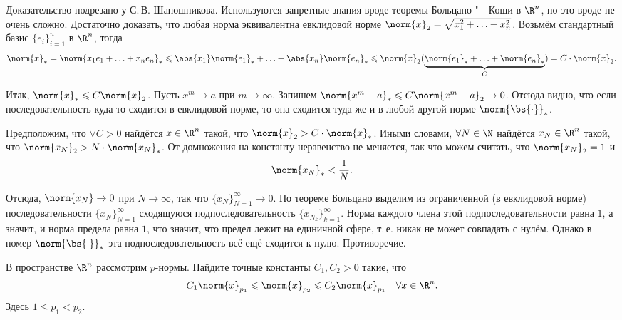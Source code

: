 \begin{solution}
    Доказательство подрезано у С.\,В. Шапошникова. Используются запретные знания вроде теоремы Больцано "---Коши в $\R^n$, но это вроде не очень сложно. Достаточно доказать, что любая норма эквивалентна евклидовой норме $\norm{x}_2 = \sqrt{x_1^2 + \ldots + x_n^2}$. Возьмём стандартный базис $\{e_i\}_{i = 1}^n$ в $\R^n$, тогда
    \[
        \norm{x}_\ast = \norm{x_1e_1 + \ldots + x_ne_n}_\ast \leqslant \abs{x_1}\norm{e_1}_\ast + \ldots + \abs{x_n}\norm{e_n}_\ast \leqslant \norm{x}_2(\underbrace{\norm{e_1}_\ast + \ldots + \norm{e_n}_\ast}_C) = C \cdot \norm{x}_2.
    \]

    Итак, $\norm{x}_\ast \leqslant C\norm{x}_2$. Пусть $x^m \to a$ при $m \to \infty$. Запишем $\norm{x^m - a}_\ast \leqslant C\norm{x^m - a}_2 \to 0$. Отсюда видно, что если последовательность куда-то сходится в евклидовой норме, то она сходится туда же и в любой другой норме $\norm{\bs{\cdot}}_\ast$.

    Предположим, что $\forall C > 0$ найдётся $x \in \R^n$ такой, что $\norm{x}_2 > C \cdot \norm{x}_\ast$. Иными словами, $\forall N \in \N$ найдётся $x_N \in \R^n$ такой, что $\norm{x_N}_2 > N \cdot \norm{x_N}_\ast$. От домножения на константу неравенство не меняется, так что можем считать, что $\norm{x_N}_2 = 1$ и
    \[
        \norm{x_N}_\ast < \frac{1}{N}.
    \]

    Отсюда, $\norm{x_N} \to 0$ при $N \to \infty$, так что $\{x_N\}_{N = 1}^\infty \to 0$. По теореме Больцано выделим из ограниченной (в евклидовой норме) последовательности $\{x_N\}_{N = 1}^\infty$ сходящуюся подпоследовательность $\{x_{N_k}\}_{k = 1}^\infty$. Норма каждого члена этой подпоследовательности равна $1$, а значит, и норма предела равна $1$, что значит, что предел лежит на единичной сфере, т.\,е. никак не может совпадать с нулём. Однако в номер $\norm{\bs{\cdot}}_\ast$ эта подпоследовательность всё ещё сходится к нулю. Противоречие.
\end{solution}

\begin{problem}[49]
    В пространстве $\R^n$ рассмотрим $p$-нормы. Найдите точные константы $C_1, C_2 > 0$ такие, что
    \[
        C_1\norm{x}_{p_1} \leqslant \norm{x}_{p_2} \leqslant C_2\norm{x}_{p_1}\quad\forall x \in \R^n.
    \]
    Здесь $1 \leqslant p_1 < p_2$.
\end{problem}

